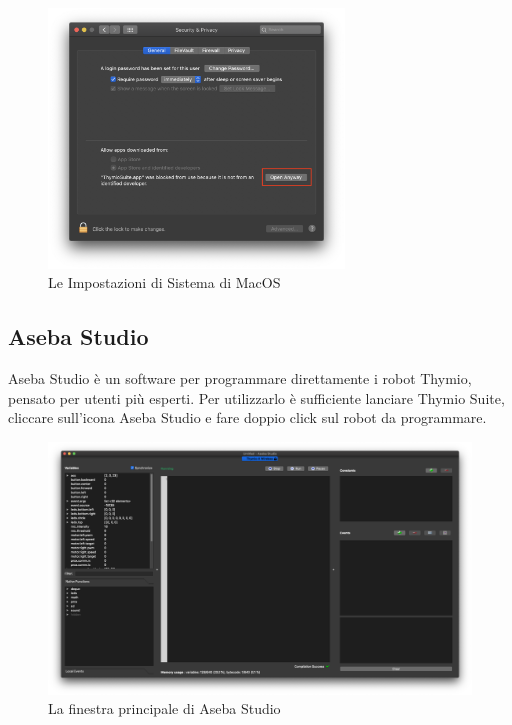 \documentclass[12pt]{article}
\begin{document}
	\begin{figure}[H]
		\centering
			\includegraphics[width=0.7\textwidth]{img/macWarn.png}
			\caption{Le Impostazioni di Sistema di MacOS}
			\label{macErr}
	\end{figure}
	
	\newpage
		
	\subsection{Aseba Studio}
	
		Aseba Studio è un software per programmare direttamente i robot Thymio, pensato per utenti più esperti. Per utilizzarlo è sufficiente lanciare Thymio Suite, cliccare sull'icona Aseba Studio e fare doppio click sul robot da programmare.
		
		\begin{figure}[H]
			\includegraphics[width=\textwidth]{img/asebaStudio.png}
			\caption{La finestra principale di Aseba Studio}
			\label{main_aseba}
		\end{figure}		
		
\end{document}
